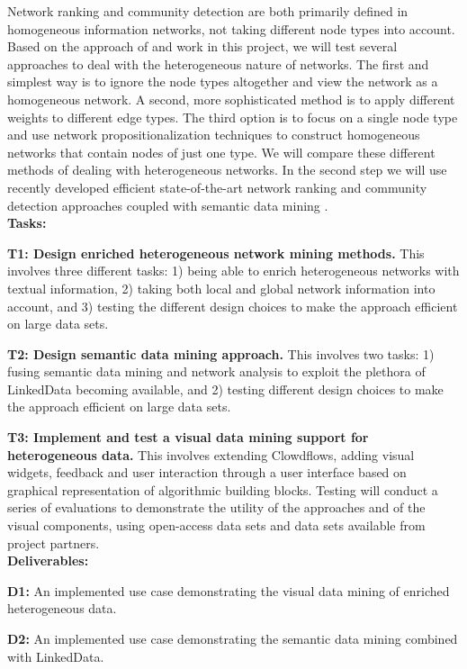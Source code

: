 \documentclass[a4paper,11pt]{article}
\begin{document}
Network ranking and community detection are both primarily defined in homogeneous information networks, not taking different node types into account. Based on the approach of  \citep{grcar2012} and work in this project, we will test several approaches to deal with the heterogeneous nature of networks. The first and simplest way is to ignore the node types altogether and view the network as a homogeneous network. A second, more sophisticated  method is to apply different weights to different edge types. The third option is to focus on a single node type and use network propositionalization techniques to construct homogeneous networks that contain nodes of just one type. We will compare these different methods of dealing with heterogeneous networks.
In the second step we will use recently developed efficient state-of-the-art network ranking and community detection approaches  \citep{Li2015,Le2015,Shang2016} coupled with semantic data mining \citep{Vavpetic2013}.
\\[0,2cm]
\textbf{Tasks:}

\textbf{T1: Design enriched heterogeneous network mining methods.} This involves three different tasks: 1) being able to enrich heterogeneous networks with textual information, 2) taking both local and global  network information into account, and 3) testing the different design choices to make the approach efficient on large data sets.

\textbf{T2: Design semantic data mining approach.} This involves two tasks: 1) fusing semantic data mining and network analysis to exploit the plethora of LinkedData becoming available, and 2) testing different design choices to make the approach efficient on large data sets.

\textbf{T3: Implement and test a visual data mining support for heterogeneous data.} This involves extending Clowdflows, adding visual widgets, feedback and user interaction through a user interface based on graphical representation of algorithmic building blocks. Testing will conduct a series of evaluations to demonstrate the utility of the approaches and of the visual components, using open-access data sets and data sets available from project partners.
\\[0,2cm]
\textbf{Deliverables:}

\textbf{D1:} An implemented use case demonstrating the visual data mining of enriched heterogeneous data. 

\textbf{D2:} An implemented use case demonstrating the semantic data mining combined with LinkedData. 
\end{document}

